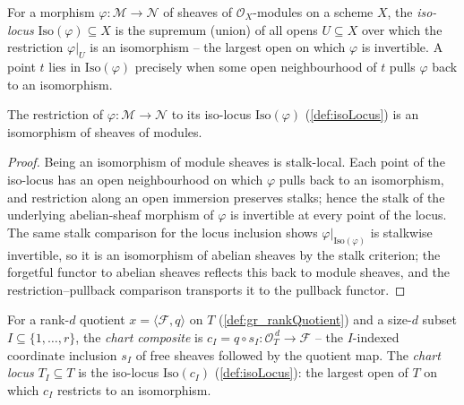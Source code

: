 \begin{definition}\leanok
  \label{def:isoLocus}
  For a morphism \(\varphi : \mathcal{M} \to \mathcal{N}\) of sheaves of
  \(\mathcal{O}_X\)-modules on a scheme \(X\), the \emph{iso-locus}
  \(\mathrm{Iso}(\varphi) \subseteq X\) is the supremum (union) of all opens
  \(U \subseteq X\) over which the restriction \(\varphi|_U\) is an isomorphism -- the largest
  open on which \(\varphi\) is invertible. A point \(t\) lies in \(\mathrm{Iso}(\varphi)\)
  precisely when some open neighbourhood of \(t\) pulls \(\varphi\) back to an isomorphism.
\end{definition}

\begin{lemma}\leanok
  \label{lem:isIso_pullback_isoLocus_map}
  The restriction of \(\varphi : \mathcal{M} \to \mathcal{N}\) to its iso-locus
  \(\mathrm{Iso}(\varphi)\) (\cref{def:isoLocus}) is an isomorphism of sheaves of modules.
\end{lemma}
\begin{proof}
  Being an isomorphism of module sheaves is stalk-local. Each point of the iso-locus has an
  open neighbourhood on which \(\varphi\) pulls back to an isomorphism, and restriction along
  an open immersion preserves stalks; hence the stalk of the underlying abelian-sheaf morphism
  of \(\varphi\) is invertible at every point of the locus. The same stalk comparison for the
  locus inclusion shows \(\varphi|_{\mathrm{Iso}(\varphi)}\) is stalkwise invertible, so it is
  an isomorphism of abelian sheaves by the stalk criterion; the forgetful functor to abelian
  sheaves reflects this back to module sheaves, and the restriction--pullback comparison
  transports it to the pullback functor.
\end{proof}

\begin{definition}\leanok
  \label{def:chartLocus}
  For a rank-\(d\) quotient \(x = \langle \mathcal{F}, q\rangle\) on \(T\)
  (\cref{def:gr_rankQuotient}) and a size-\(d\) subset \(I \subseteq \{1,\dots,r\}\), the
  \emph{chart composite} is \(c_I = q \circ s_I : \mathcal{O}_T^{\,d} \to \mathcal{F}\) -- the
  \(I\)-indexed coordinate inclusion \(s_I\) of free sheaves followed by the quotient map. The
  \emph{chart locus} \(T_I \subseteq T\) is the iso-locus \(\mathrm{Iso}(c_I)\)
  (\cref{def:isoLocus}): the largest open of \(T\) on which \(c_I\) restricts to an
  isomorphism.
\end{definition}

